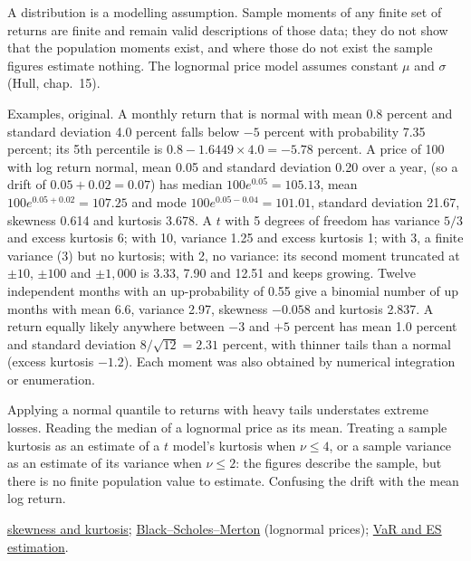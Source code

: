 \begin{qfdefinition}
 A distribution is a modelling assumption. Sample moments of any finite set of returns are finite and remain valid descriptions of those data; they do not show that the population moments exist, and where those do not exist the sample figures estimate nothing. The lognormal price model assumes constant $\mu$ and $\sigma$ (Hull, chap.~15).

 Examples, original. A monthly return that is normal with mean 0.8 percent and standard deviation 4.0 percent falls below $-5$ percent with probability 7.35 percent; its 5th percentile is $0.8-1.6449\times4.0=-5.78$ percent. A price of 100 with log return normal, mean 0.05 and standard deviation 0.20 over a year, (so a drift of $0.05+0.02=0.07$) has median $100e^{0.05}=105.13$, mean $100e^{0.05+0.02}=107.25$ and mode $100e^{0.05-0.04}=101.01$, standard deviation 21.67, skewness 0.614 and kurtosis 3.678. A $t$ with 5 degrees of freedom has variance $5/3$ and excess kurtosis 6; with 10, variance 1.25 and excess kurtosis 1; with 3, a finite variance (3) but no kurtosis; with 2, no variance: its second moment truncated at $\pm10$, $\pm100$ and $\pm1{,}000$ is 3.33, 7.90 and 12.51 and keeps growing. Twelve independent months with an up-probability of 0.55 give a binomial number of up months with mean 6.6, variance 2.97, skewness $-0.058$ and kurtosis 2.837. A return equally likely anywhere between $-3$ and $+5$ percent has mean 1.0 percent and standard deviation $8/\sqrt{12}=2.31$ percent, with thinner tails than a normal (excess kurtosis $-1.2$). Each moment was also obtained by numerical integration or enumeration.

 Applying a normal quantile to returns with heavy tails understates extreme losses. Reading the median of a lognormal price as its mean. Treating a sample kurtosis as an estimate of a $t$ model's kurtosis when $\nu\le4$, or a sample variance as an estimate of its variance when $\nu\le2$: the figures describe the sample, but there is no finite population value to estimate. Confusing the drift with the mean log return.

 \hyperref[def:return-shape-statistics]{skewness and kurtosis}; \hyperref[mod:black-scholes-merton]{Black--Scholes--Merton} (lognormal prices); \hyperref[meth:var-es-estimation-methods]{VaR and ES estimation}.

\end{qfdefinition}

